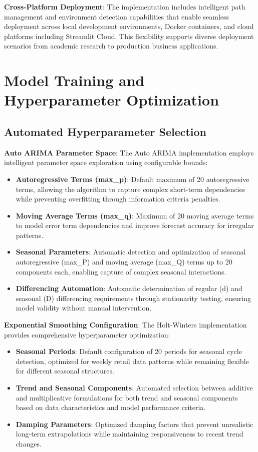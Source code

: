 \textbf{Cross-Platform Deployment}: The implementation includes intelligent path management and environment detection capabilities that enable seamless deployment across local development environments, Docker containers, and cloud platforms including Streamlit Cloud. This flexibility supports diverse deployment scenarios from academic research to production business applications.

\section{Model Training and Hyperparameter Optimization}

\subsection{Automated Hyperparameter Selection}

\textbf{Auto ARIMA Parameter Space}: The Auto ARIMA implementation employs intelligent parameter space exploration using configurable bounds:
\begin{itemize}
\item \textbf{Autoregressive Terms (max\_p)}: Default maximum of 20 autoregressive terms, allowing the algorithm to capture complex short-term dependencies while preventing overfitting through information criteria penalties.
\item \textbf{Moving Average Terms (max\_q)}: Maximum of 20 moving average terms to model error term dependencies and improve forecast accuracy for irregular patterns.
\item \textbf{Seasonal Parameters}: Automatic detection and optimization of seasonal autoregressive (max\_P) and moving average (max\_Q) terms up to 20 components each, enabling capture of complex seasonal interactions.
\item \textbf{Differencing Automation}: Automatic determination of regular (d) and seasonal (D) differencing requirements through stationarity testing, ensuring model validity without manual intervention.
\end{itemize}

\textbf{Exponential Smoothing Configuration}: The Holt-Winters implementation provides comprehensive hyperparameter optimization:
\begin{itemize}
\item \textbf{Seasonal Periods}: Default configuration of 20 periods for seasonal cycle detection, optimized for weekly retail data patterns while remaining flexible for different seasonal structures.
\item \textbf{Trend and Seasonal Components}: Automated selection between additive and multiplicative formulations for both trend and seasonal components based on data characteristics and model performance criteria.
\item \textbf{Damping Parameters}: Optimized damping factors that prevent unrealistic long-term extrapolations while maintaining responsiveness to recent trend changes.
\end{itemize}

